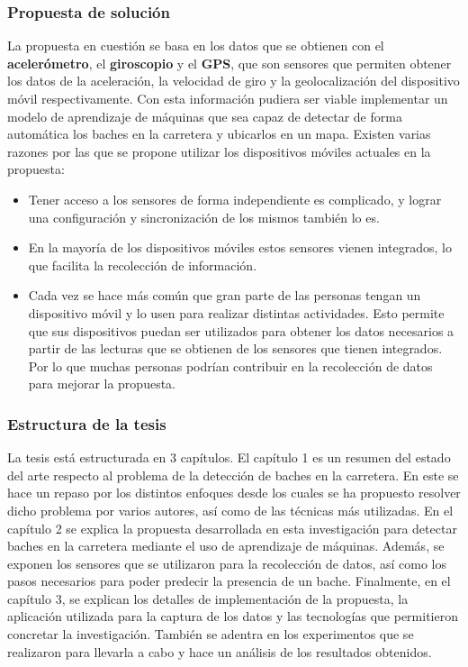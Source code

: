 	\subsubsection*{Propuesta de solución}
		La propuesta en cuestión se basa en los datos que se obtienen con el \textbf{acelerómetro}, el \textbf{giroscopio} y el \textbf{GPS}, que
		son sensores que permiten obtener los datos de la aceleración, la velocidad de giro y la geolocalización del dispositivo móvil respectivamente.
		Con esta información pudiera ser viable implementar un modelo de aprendizaje de máquinas que sea capaz de detectar de forma automática los baches
		en la carretera y ubicarlos en un mapa. Existen varias razones por las que se propone utilizar los dispositivos móviles actuales en la propuesta:\\

		\begin{itemize}
			\item Tener acceso a los sensores de forma independiente es complicado, y lograr una configuración y sincronización de los mismos también lo es.
			\item En la mayoría de los dispositivos móviles estos sensores vienen integrados, lo que facilita la recolección de información.
			\item Cada vez se hace más común que gran parte de las personas tengan un dispositivo móvil y lo usen para realizar distintas actividades.
				Esto permite que sus dispositivos puedan ser utilizados para obtener los datos necesarios a partir de las lecturas que se obtienen de los
				sensores que tienen integrados. Por lo que muchas personas podrían contribuir en la recolección de datos para mejorar la propuesta.
		\end{itemize}

	\subsubsection*{Estructura de la tesis}
		La tesis está estructurada en 3 capítulos. El capítulo 1 es un resumen del estado del arte respecto al problema de la detección de baches en
		la carretera. En este se hace un repaso por los distintos enfoques desde los cuales se ha propuesto resolver dicho problema por varios autores,
		así como de las técnicas más utilizadas. En el capítulo 2 se explica la propuesta desarrollada en esta investigación para detectar baches en la
		carretera mediante el uso de aprendizaje de máquinas. Además, se exponen los sensores que se utilizaron para la recolección de datos, así 
		como los pasos necesarios para poder predecir la presencia de un bache. Finalmente, en el capítulo 3, se explican los detalles 
		de implementación de la propuesta, la aplicación utilizada para la captura de los datos y las tecnologías que permitieron concretar la investigación.
		También se adentra en los experimentos que se realizaron para llevarla  a cabo y hace un análisis de los resultados obtenidos.
		

